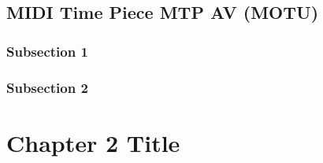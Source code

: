 \documentclass{tufte-book} %
\begin{document}
\section{MIDI Time Piece MTP AV (MOTU)}
\subsection{Subsection 1}

\lipsum[9-10]

\subsection{Subsection 2}

\lipsum[11-12]


\chapter{Chapter 2 Title}
\label{ch:2}

\lipsum[13-20]


\backmatter




\printindex %
\end{document}
